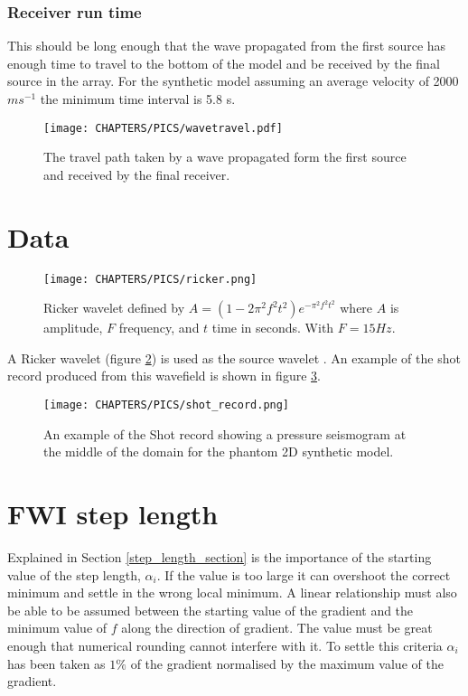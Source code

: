 \subsubsection{Receiver run time}
This should be long enough that the wave propagated from the first source has enough time to travel to the bottom of the model and be received by the final source in the array. For the synthetic model assuming an average velocity of 2000 $ms^{-1}$ the minimum time interval is 5.8 s. 
\begin{figure}[!ht]
\begin{center}
 \texttt{[image: CHAPTERS/PICS/wavetravel.pdf]}
\caption[Schematic of waves travel path]{The travel path taken by a wave propagated form the first source and received by the final receiver.}
\label{parallel}
\end{center}
\end{figure}


\section{Data}
\begin{figure}[!ht]
\begin{center}
 \texttt{[image: CHAPTERS/PICS/ricker.png]}
\caption[Ricker wavelet used as the source wave]{Ricker wavelet defined by $A = (1-2 \pi^{2}f^{2}t^2)e^{-\pi^{2}f^{2}t^{2}}$ where $A$ is amplitude, $F$ frequency, and $t$ time in seconds. With $F = 15Hz$. }
\label{ricker}
\end{center}
\end{figure}

A Ricker wavelet (figure \ref{ricker}) is used as the source wavelet \citep{wang2015frequencies}.  An example of the shot record produced from this wavefield is shown in figure \ref{shot}. 

\begin{figure}[!ht]
\begin{center}
 \texttt{[image: CHAPTERS/PICS/shot\_record.png]}
\caption[Shot Record]{An example of the Shot record showing a pressure seismogram at the middle of the domain for the phantom 2D synthetic model.}
\label{shot}
\end{center}
\end{figure}

\section{FWI step length}
Explained in Section \ref{step_length_section} is the importance of the starting value of the step length, $\alpha_{i}$. If the value is too large it can overshoot the correct minimum and settle in the wrong local minimum. A linear relationship must also be able to be assumed between the starting value of the gradient and the minimum value of $f$ along the direction of gradient. The value must be great enough that numerical rounding cannot interfere with it. To settle this criteria $\alpha_{i}$ has been taken as $1\%$ of the gradient normalised by the maximum value of the gradient. 

